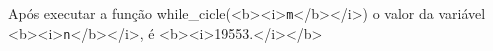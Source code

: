 \documentclass[12pt,varwidth=1<b><i>19553</b></i>cm,border=1pt]{standalone}
\begin{document}
 
 
Após executar a função while\_cicle(<b><i>\verb+m+</b></i>) o valor da variável <b><i>\verb+n+</b></i>, é <b><i>19553.</i></b> 
 
\questiomtrue 
 
\end{document}
